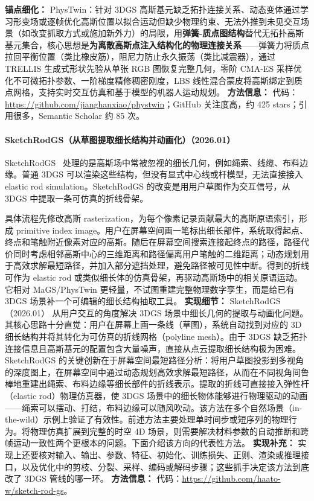 \textbf{锚点细化：} PhysTwin：针对 3DGS 高斯基元缺乏拓扑连接关系、动态变体通过学习形变场或逐帧优化高斯位置以拟合运动但缺少物理约束、无法外推到未见交互场景（如改变抓取方式或施加新外力）的局限，用\textbf{弹簧-质点图结构}替代无拓扑高斯基元集合，核心思想是\textbf{为离散高斯点注入结构化的物理连接关系}——弹簧力将质点拉回平衡位置（类比橡皮筋），阻尼力防止永久振荡（类比减震器），通过 TRELLIS 生成式形状先验从单张 RGB 图恢复完整几何，零阶 CMA-ES 采样优化不可微拓扑参数、一阶梯度精修稠密刚度，LBS 线性混合蒙皮将高斯绑定到质点网格，支持实时交互仿真和基于模型的机器人运动规划。
\textbf{方法信息：} 代码：\url{https://github.com/jianghanxiao/phystwin}；GitHub 关注度高，约 425 stars；引用很多，Semantic Scholar 约 85 次。



\paragraph{SketchRodGS（从草图提取细长结构并动画化）（2026.01）}
SketchRodGS~\cite{2601_02072} 处理的是高斯场中常被忽视的细长几何，例如绳索、线缆、布料边缘。普通 3DGS 可以渲染这些结构，但没有显式中心线或杆模型，无法直接接入 elastic rod simulation。SketchRodGS 的改变是用用户草图作为交互信号，从 3DGS 中提取一条可仿真的折线骨架。

具体流程先修改高斯 rasterization，为每个像素记录贡献最大的高斯原语索引，形成 primitive index image。用户在屏幕空间画一笔标出细长部件，系统取得起点、终点和笔触附近像素对应的高斯。随后在屏幕空间搜索连接起终点的路径，路径代价同时考虑相邻高斯中心的三维距离和路径偏离用户笔触的二维距离；动态规划用于高效求解最短路径，并加入部分遮挡处理，避免路径被可见性中断。得到的折线可作为 elastic rod 或类似细长体的仿真骨架，再驱动高斯场中的相关原语运动。它相对 MaGS/PhysTwin 更轻量，不试图重建完整物理数字孪生，而是给已有 3DGS 场景补一个可编辑的细长结构抽取工具。
\textbf{实现细节：} SketchRodGS（2026.01） 从用户交互的角度解决 3DGS 场景中细长几何的提取与动画化问题。其核心思路十分直觉：用户在屏幕上画一条线（草图），系统自动找到对应的 3D 细长结构并将其转化为可仿真的折线网格（polyline mesh）。由于 3DGS 缺乏拓扑连接信息且高斯基元的配置包含大量噪声，直接从点云提取细长结构极为困难。SketchRodGS 的关键创新在于屏幕空间最短路径分析：将用户草图投影到多视角的深度图上，在屏幕空间中通过动态规划高效求解最短路径，从而在不同视角间鲁棒地重建出绳索、布料边缘等细长部件的折线表示。提取的折线可直接接入弹性杆（elastic rod）物理仿真器，使 3DGS 场景中的细长物体能够进行物理驱动的动画——绳索可以摆动、打结，布料边缘可以随风吹动。该方法在多个自然场景（in-the-wild）示例上验证了有效性。前述方法主要处理单时间步或短序列的物理行为。将物理仿真扩展到完整的时空 4D 场景，则需要解决材料参数的自动推断和跨帧运动一致性两个更根本的问题。下面介绍该方向的代表性方法。
\textbf{实现补充：} 实现上还要核对输入、输出、参数、特征、初始化、训练损失、正则、渲染或推理接口，以及优化中的剪枝、分裂、采样、编码或解码步骤；这些抓手决定该方法到底改了 3DGS 管线的哪一环。
\textbf{方法信息：} 代码：\url{https://github.com/haato-w/sketch-rod-gs}。
